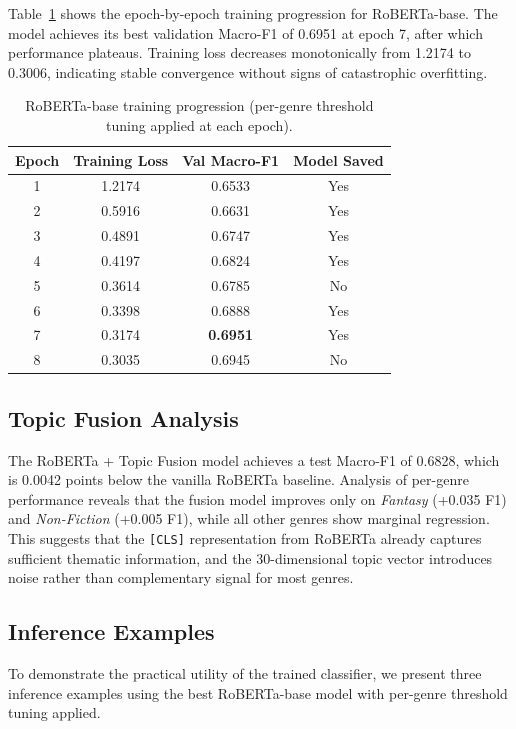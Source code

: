 \documentclass[11pt,a4paper]{article}
\begin{document}
Table~\ref{tab:epochs} shows the epoch-by-epoch training progression for RoBERTa-base. The model achieves its best validation Macro-F1 of 0.6951 at epoch 7, after which performance plateaus. Training loss decreases monotonically from 1.2174 to 0.3006, indicating stable convergence without signs of catastrophic overfitting.

\begin{table}[H]
\centering
\caption{RoBERTa-base training progression (per-genre threshold tuning applied at each epoch).}
\label{tab:epochs}
\begin{tabular}{cccc}
\toprule
\textbf{Epoch} & \textbf{Training Loss} & \textbf{Val Macro-F1} & \textbf{Model Saved} \\
\midrule
1 & 1.2174 & 0.6533 & Yes \\
2 & 0.5916 & 0.6631 & Yes \\
3 & 0.4891 & 0.6747 & Yes \\
4 & 0.4197 & 0.6824 & Yes \\
5 & 0.3614 & 0.6785 & No \\
6 & 0.3398 & 0.6888 & Yes \\
7 & 0.3174 & \textbf{0.6951} & Yes \\
8 & 0.3035 & 0.6945 & No \\
\bottomrule
\end{tabular}
\end{table}

\subsection{Topic Fusion Analysis}

The RoBERTa + Topic Fusion model achieves a test Macro-F1 of 0.6828, which is 0.0042 points below the vanilla RoBERTa baseline. Analysis of per-genre performance reveals that the fusion model improves only on \textit{Fantasy} (+0.035 F1) and \textit{Non-Fiction} (+0.005 F1), while all other genres show marginal regression. This suggests that the \texttt{[CLS]} representation from RoBERTa already captures sufficient thematic information, and the 30-dimensional topic vector introduces noise rather than complementary signal for most genres.

\subsection{Inference Examples}

To demonstrate the practical utility of the trained classifier, we present three inference examples using the best RoBERTa-base model with per-genre threshold tuning applied.
\end{document}
